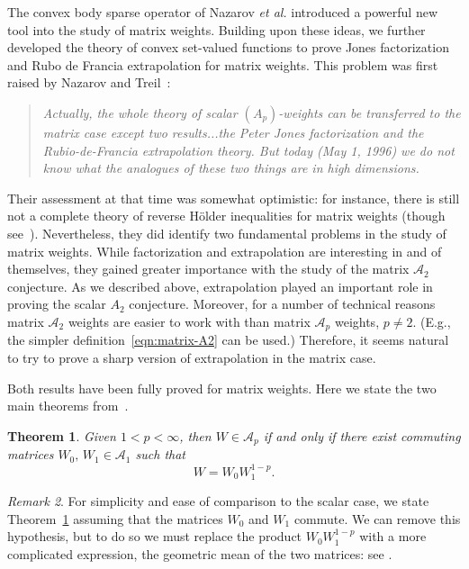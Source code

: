 \documentclass[12pt]{amsart}
\newtheorem{theorem}{Theorem}[section]
\theoremstyle{definition}
\theoremstyle{remark}
\newtheorem{remark}[theorem]{Remark}
\numberwithin{equation}{section}
\newcommand{\A}{\mathcal A}
\begin{document}
The convex body sparse operator of
Nazarov {\em et al.} introduced a powerful new tool into the study of
matrix weights.  Building upon these ideas, we further developed the
theory of convex set-valued functions to prove Jones factorization
and Rubo de Francia extrapolation for matrix weights.   This problem
was first raised by Nazarov and Treil~\cite{MR1428988}:
%
\begin{quote}
    {\em Actually, the whole theory of scalar $(A_p)$-weights  can be
      transferred to the matrix case except two results...the Peter
      Jones factorization and the Rubio-de-Francia extrapolation
      theory.  But today (May 1, 1996) we do not know what the
      analogues of these two things are in high dimensions.}
    \end{quote}
    Their assessment at that time was somewhat optimistic: for
    instance, there is still not a complete theory of reverse H\"older
    inequalities for matrix weights (though
    see~\cite{davey2022exponential}).  Nevertheless, they did identify
    two fundamental problems in the study of matrix weights.  While
    factorization and extrapolation are interesting in and of
    themselves, they gained greater importance with the study of the
    matrix $\A_2$ conjecture.  As we described above, extrapolation
    played an important role in proving the scalar $A_2$ conjecture.
    Moreover, for a number of technical reasons matrix $\A_2$ weights
    are easier to work with than matrix $\A_p$ weights, $p\neq
    2$. (E.g., the simpler definition~\eqref{eqn:matrix-A2} can be
    used.)  Therefore, it seems natural to try to prove a sharp
    version of extrapolation in the matrix case.

    Both results have been fully proved for matrix
    weights.  Here we state the two main theorems from~\cite{mb-2022}.

    \begin{theorem} \label{thm:matrix-jones}
Given $1<p<\infty$, then $W\in \A_p$ if and only if
          there exist commuting matrices $W_0,\,W_1\in \A_1$ such that
         \[ W = W_0W_1^{1-p}. \]
     \end{theorem}

\begin{remark}
  For simplicity and ease of comparison to the scalar case, we state
  Theorem~\ref{thm:matrix-jones} assuming that the
  matrices $W_0$ and $W_1$ 
  commute.  We can remove this hypothesis, but to do so we must
  replace the product $W_0W_1^{1-p}$ with a more complicated
  expression, the geometric  mean of the two matrices:  see
  \cite{bhatia}. 
\end{remark}
\end{document}
